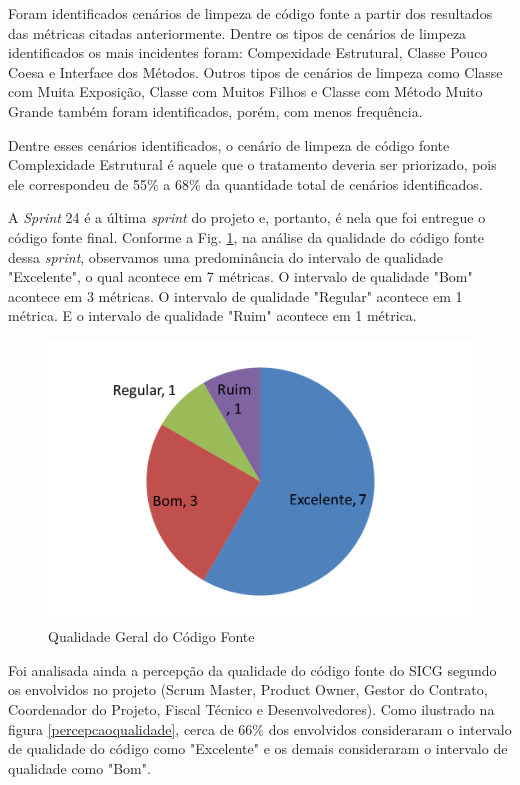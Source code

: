 Foram identificados cenários de limpeza de código fonte a partir dos resultados das métricas citadas anteriormente. Dentre os tipos de cenários de limpeza identificados os mais incidentes foram: 
Compexidade Estrutural, Classe Pouco Coesa e Interface dos Métodos. Outros tipos de cenários de limpeza como Classe com Muita Exposição, Classe
com Muitos Filhos e Classe com Método Muito Grande também foram identificados, porém, com menos frequência.

Dentre esses cenários identificados, o cenário de limpeza de código fonte Complexidade Estrutural é aquele que o tratamento deveria
ser priorizado, pois ele correspondeu de 55\% a 68\% da quantidade total de cenários identificados.

A \textit{Sprint} 24 é a última \textit{sprint} do projeto e, portanto, é nela que foi entregue o código fonte final. Conforme a Fig. \ref{pizzatotal}, na análise da qualidade do código fonte dessa \textit{sprint}, observamos uma predominância do intervalo de qualidade "Excelente", o qual acontece em 7 métricas. O intervalo de qualidade "Bom" acontece em 3 métricas. O intervalo de qualidade "Regular" acontece em 1 métrica. E o intervalo de qualidade "Ruim" acontece em 1 métrica.

\begin{figure}[h]
		\centering
			\includegraphics[scale=0.5]{figuras/pizzatotal.png}
		\caption{Qualidade Geral do Código Fonte}
		\label{pizzatotal}
\end{figure}


Foi analisada ainda a percepção da qualidade do código fonte do SICG segundo os envolvidos no projeto (Scrum Master, Product Owner, Gestor do Contrato, Coordenador do Projeto, Fiscal Técnico e Desenvolvedores). Como ilustrado na figura \ref{percepcaoqualidade}, cerca de 66\% dos envolvidos consideraram  o intervalo de qualidade do código como "Excelente" e os demais consideraram
o intervalo de qualidade como "Bom".


